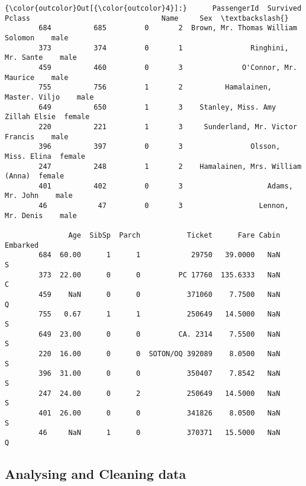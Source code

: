 \documentclass[11pt]{article}
\begin{document}
\begin{Verbatim}[commandchars=\\\{\}]
{\color{outcolor}Out[{\color{outcolor}4}]:}      PassengerId  Survived  Pclass                               Name     Sex  \textbackslash{}
        684          685         0       2  Brown, Mr. Thomas William Solomon    male   
        373          374         0       1                Ringhini, Mr. Sante    male   
        459          460         0       3              O'Connor, Mr. Maurice    male   
        755          756         1       2          Hamalainen, Master. Viljo    male   
        649          650         1       3    Stanley, Miss. Amy Zillah Elsie  female   
        220          221         1       3     Sunderland, Mr. Victor Francis    male   
        396          397         0       3                Olsson, Miss. Elina  female   
        247          248         1       2    Hamalainen, Mrs. William (Anna)  female   
        401          402         0       3                    Adams, Mr. John    male   
        46            47         0       3                  Lennon, Mr. Denis    male   
        
               Age  SibSp  Parch           Ticket      Fare Cabin Embarked  
        684  60.00      1      1            29750   39.0000   NaN        S  
        373  22.00      0      0         PC 17760  135.6333   NaN        C  
        459    NaN      0      0           371060    7.7500   NaN        Q  
        755   0.67      1      1           250649   14.5000   NaN        S  
        649  23.00      0      0         CA. 2314    7.5500   NaN        S  
        220  16.00      0      0  SOTON/OQ 392089    8.0500   NaN        S  
        396  31.00      0      0           350407    7.8542   NaN        S  
        247  24.00      0      2           250649   14.5000   NaN        S  
        401  26.00      0      0           341826    8.0500   NaN        S  
        46     NaN      1      0           370371   15.5000   NaN        Q  
\end{Verbatim}
            
    \hypertarget{analysing-and-cleaning-data}{%
\subsection{Analysing and Cleaning
data}\label{analysing-and-cleaning-data}}
\end{document}
